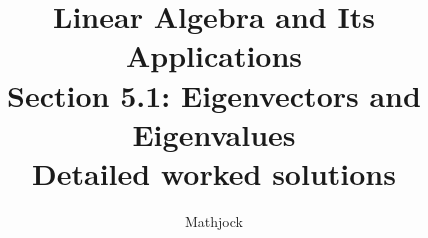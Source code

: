 
\title{\textbf{Linear Algebra and Its Applications}\\[0.3em]Section 5.1: Eigenvectors and Eigenvalues\\[0.3em]\large Detailed worked solutions}
\author{Mathjock}
\date{}

\maketitle
\bookinfo
\tableofcontents
\clearpage
\renewcommand{\thesection}{5.\arabic{section}}
\renewcommand{\theHsection}{5.\arabic{section}}
\setcounter{section}{0}



